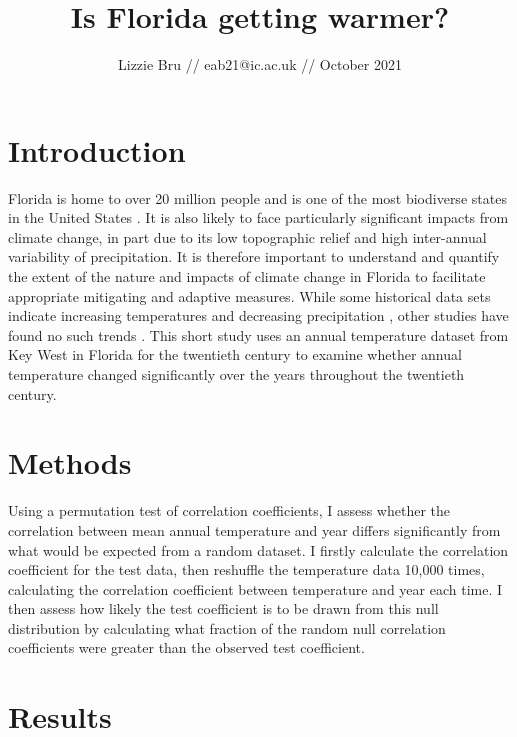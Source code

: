\documentclass{article}
\title{\textbf{Is Florida getting warmer?\vspace{-0.5em}}}
\author{Lizzie Bru // eab21@ic.ac.uk // October 2021}
\date{}
\begin{document}
	
	\maketitle
	
	\section{Introduction \vspace{-0.5em}}
	
	Florida is home to over 20 million people and is one of the most biodiverse states in the United States \cite{usda}. It is also likely to face particularly significant impacts from climate change, in part due to its low topographic relief and high inter-annual variability of precipitation. It is therefore important to understand and quantify the extent of the nature and impacts of climate change in Florida to facilitate appropriate mitigating and adaptive measures. While some historical data sets indicate increasing temperatures and decreasing precipitation \cite{irizarry2013historical}, other studies have found no such trends \cite{obeysekera2011climate}. This short study uses an annual temperature dataset from Key West in Florida for the twentieth century to examine whether annual temperature changed significantly over the years throughout the twentieth century. \vspace{-1em}
	
	\section{Methods \vspace{-0.5em}}
	
	Using a permutation test of correlation coefficients, I assess whether the correlation between mean annual temperature and year differs significantly from what would be expected from a random dataset. I firstly calculate the correlation coefficient for the test data, then reshuffle the temperature data 10,000 times, calculating the correlation coefficient between temperature and year each time. I then assess how likely the test coefficient is to be drawn from this null distribution by calculating what fraction of the random null correlation coefficients were greater than the observed test coefficient. \vspace{-1em}
	
	\section{Results \vspace{-0.5em}}
	
\end{document}
